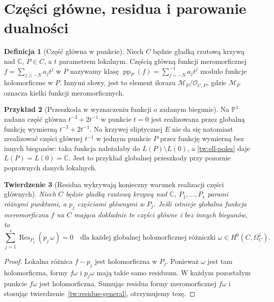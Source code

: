 \documentclass[11pt,a4paper,openany]{report}
\numberwithin{equation}{section}
\theoremstyle{plain}
\newtheorem{twierdzenie}{Twierdzenie}[section]
\theoremstyle{definition}
\newtheorem{definicja}[twierdzenie]{Definicja}
\newtheorem{przyklad}[twierdzenie]{Przykład}
\theoremstyle{remark}
\newcommand{\C}{\mathbb C}
\newcommand{\PP}{\mathbb P}
\begin{document}
\section{Części główne, residua i parowanie dualności}
\label{sec:principal-residue-pairing}

\begin{definicja}[Część główna w punkcie]
Niech $C$ będzie gładką rzutową krzywą nad $\C$,
$P\in C$, a $t$ parametrem lokalnym. Częścią główną
funkcji meromorficznej $f=\sum_{j\ge-N}a_jt^j$
w $P$ nazywamy klasę
$\operatorname{pp}_P(f)=\sum_{j=-N}^{-1}a_jt^j$
modulo funkcje holomorficzne w $P$.
Innymi słowy, jest to element ilorazu
$\mathcal M_P/\mathcal O_{C,P}$, gdzie
$\mathcal M_P$ oznacza kiełki funkcji meromorficznych.
\end{definicja}

\begin{przyklad}[Przeszkoda w wyznaczeniu funkcji o zadanym biegunie]
Na $\PP^1$ zadana część główna $t^{-3}+2t^{-1}$
w punkcie $t=0$ jest realizowana przez globalną
funkcję wymierną $t^{-3}+2t^{-1}$. Na krzywej
eliptycznej $E$ nie da się natomiast zrealizować
części głównej $t^{-1}$ w jednym punkcie $P$ przez
funkcję wymierną bez innych biegunów:
taka funkcja należałaby do $L(P)\setminus L(0)$,
a \ref{tw:ell-poles} daje $L(P)=L(0)=\C$.
Jest to przykład globalnej przeszkody przy
pozornie poprawnych danych lokalnych.
\end{przyklad}

\begin{twierdzenie}[Residua wykrywają konieczny warunek realizacji części głównych]
Niech $C$ będzie gładką rzutową krzywą nad $\C$,
$P_1,\ldots,P_s$ parami różnymi punktami, a $p_j$
częściami głównymi w $P_j$. Jeśli istnieje globalna
funkcja meromorficzna $f$ na $C$ mająca dokładnie
te części główne i bez innych biegunów, to
\[
\sum_{j=1}^{s}\operatorname{Res}_{P_j}
  (p_j\,\omega)=0
\quad\text{dla każdej globalnej holomorficznej
różniczki }\omega\in H^0(C,\Omega^1_C).
\]
\end{twierdzenie}
\begin{proof}
Lokalna różnica $f-p_j$ jest holomorficzna
w $P_j$. Ponieważ $\omega$ jest tam holomorficzna,
formy $f\omega$ i $p_j\omega$ mają takie samo
residuum. W każdym pozostałym punkcie $f\omega$
jest holomorficzna. Sumując residua formy
meromorficznej $f\omega$ i stosując
twierdzenie~\ref{tw:residue-general}, otrzymujemy tezę.
\end{proof}
\end{document}
